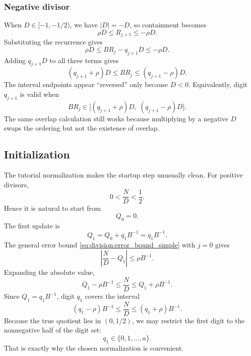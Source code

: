 \documentclass[11pt]{article}
\numberwithin{equation}{section}
\begin{document}
\subsubsection{Negative divisor}
\label{sssec:division:negative_divisor}

When $D \in [-1,-1/2)$, we have $|D| = -D$, so containment becomes
\begin{equation}
  \label{eq:division:containment_neg}
  \rho D \le R_{j+1} \le -\rho D.
\end{equation}
Substituting the recurrence gives
\begin{equation}
  \label{eq:division:selection_sub_neg}
  \rho D \le BR_j - q_{j+1}D \le -\rho D.
\end{equation}
Adding $q_{j+1}D$ to all three terms gives
\begin{equation}
  \label{eq:division:selection_interval_neg}
  (q_{j+1}+\rho)D \le BR_j \le (q_{j+1}-\rho)D.
\end{equation}
The interval endpoints appear ``reversed'' only because $D<0$.
Equivalently, digit $q_{j+1}$ is valid when
\[
  BR_j \in \bigl[(q_{j+1}+\rho)D,\; (q_{j+1}-\rho)D\bigr].
\]
The same overlap calculation still works because multiplying by a negative $D$ swaps the ordering
but not the existence of overlap.

\subsection{Initialization}
\label{ssec:division:init}

The tutorial normalization makes the startup step unusually clean.
For positive divisors,
\begin{equation}
  \label{eq:division:true_quotient_range}
  0 < \frac{N}{D} < \frac{1}{2}.
\end{equation}
Hence it is natural to start from
\begin{equation}
  \label{eq:division:q0}
  Q_0 = 0.
\end{equation}
The first update is
\begin{equation}
  \label{eq:division:q1_def}
  Q_1 = Q_0 + q_1 B^{-1} = q_1 B^{-1}.
\end{equation}
The general error bound \cref{eq:division:error_bound_simple} with $j=0$ gives
\begin{equation}
  \label{eq:division:init_error_bound}
  \left|\frac{N}{D} - Q_1\right| \le \rho B^{-1}.
\end{equation}
Expanding the absolute value,
\begin{equation}
  \label{eq:division:init_interval}
  Q_1 - \rho B^{-1} \le \frac{N}{D} \le Q_1 + \rho B^{-1}.
\end{equation}
Since $Q_1 = q_1 B^{-1}$, digit $q_1$ covers the interval
\begin{equation}
  \label{eq:division:init_interval_q1}
  \left(q_1 - \rho\right)B^{-1} \le \frac{N}{D} \le \left(q_1 + \rho\right)B^{-1}.
\end{equation}
Because the true quotient lies in $(0,1/2)$, we may restrict the first digit to the nonnegative half
of the digit set:
\[
  q_1 \in \{0,1,\dotsc,a\}.
\]
That is exactly why the chosen normalization is convenient.
\end{document}

